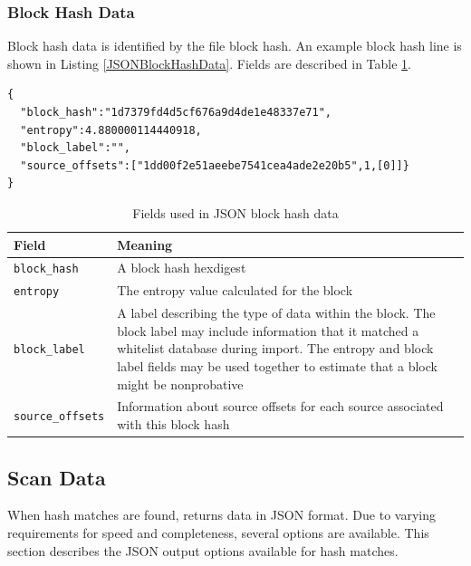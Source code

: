 \documentclass[11pt,fleqn]{article} %
\begin{document}
\subsubsection{Block Hash Data}
Block hash data is identified by the file block hash.  An example block hash line is shown in Listing \ref{JSONBlockHashData}. Fields are described in Table \ref{tab:JSONBlockHashData}.\\

\lstset{style=customfile}
\begin{lstlisting}[float, caption={Example JSON block hash data used during import/export}, label=JSONBlockHashData]
{
  "block_hash":"1d7379fd4d5cf676a9d4de1e48337e71",
  "entropy":4.880000114440918,
  "block_label":"",
  "source_offsets":["1dd00f2e51aeebe7541cea4ade2e20b5",1,[0]]}
}
\end{lstlisting}

\begin{table}[!ht]

\centering
\caption{Fields used in JSON block hash data}
\label{tab:JSONBlockHashData}
\begin{tabular}{|p{5 cm}|p{8.8 cm}|}
\hline \hline
\textbf{Field} & \textbf{Meaning} \\
\hline
\verb+block_hash+ & A block hash hexdigest\\
\hline
\verb+entropy+ & The entropy value calculated for the block\\
\hline
\verb+block_label+ & A label describing the type of data within the block. The block label may include information that it matched a whitelist database during import. The entropy and block label fields may be used together to estimate that a block might be nonprobative\\
\hline
\verb+source_offsets+ & Information about source offsets for each source associated with this block hash\\
\hline
\end{tabular}
\end{table}

\subsection{Scan Data}
\label{ScanData}
When hash matches are found, \hdb returns data in JSON format. Due to varying requirements for speed and completeness, several options are available. This section describes the JSON output options available for hash matches.\\
\end{document}
